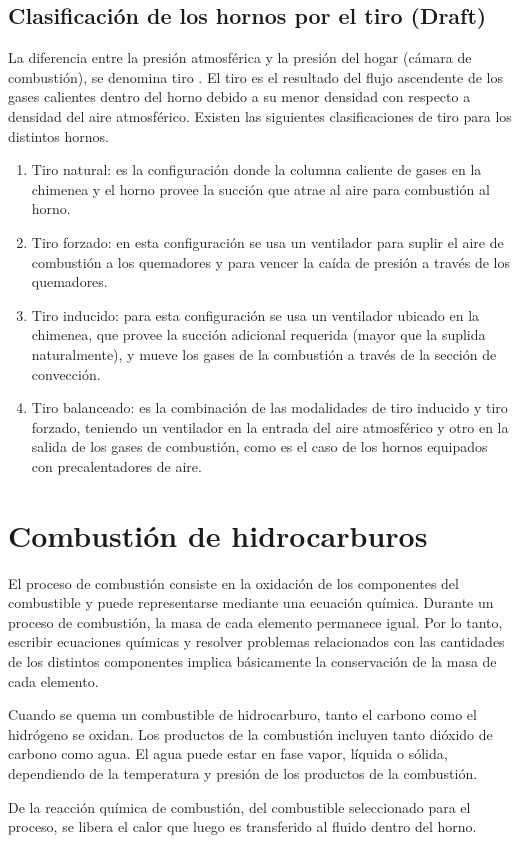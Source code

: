 \subsection{Clasificación de los hornos por el tiro (Draft)}
\par La diferencia entre la presión atmosférica y la presión del hogar (cámara de combustión), se denomina tiro \cite{bib:draft}. El tiro es el resultado del flujo ascendente de los gases calientes dentro del horno debido a su menor densidad con respecto a densidad del aire atmosférico. Existen las siguientes clasificaciones de tiro para los distintos hornos.
\begin{enumerate}
    \item Tiro natural: es la configuración donde la columna caliente de gases en la chimenea y el horno provee la succión que atrae al aire para combustión al horno.
    \item Tiro forzado: en esta configuración se usa un ventilador para suplir el aire de combustión a los quemadores y para vencer la caída de presión a través de los quemadores.
    \item Tiro inducido: para esta configuración se usa un ventilador ubicado en la chimenea, que provee la succión adicional requerida (mayor que la suplida naturalmente), y mueve los gases de la combustión a través de la sección de convección.
    \item Tiro balanceado: es la combinación de las modalidades de tiro inducido y tiro forzado, teniendo un ventilador en la entrada del aire atmosférico y otro en la salida de los gases de combustión, como es el caso de los hornos equipados con precalentadores de aire.
\end{enumerate}

\section{Combustión de hidrocarburos}

\par El proceso de combustión consiste en la oxidación de los componentes del combustible y puede representarse mediante una ecuación química. Durante un proceso de combustión, la masa de cada elemento permanece igual. Por lo tanto, escribir ecuaciones químicas y resolver problemas relacionados con las cantidades de los distintos componentes implica básicamente la conservación de la masa de cada elemento. 
\par Cuando se quema un combustible de hidrocarburo, tanto el carbono como el hidrógeno se oxidan. Los productos de la combustión incluyen tanto dióxido de carbono como agua. El agua puede estar en fase vapor, líquida o sólida, dependiendo de la temperatura y presión de los productos de la combustión.
\par De la reacción química de combustión, del combustible seleccionado para el proceso, se libera el calor que luego es transferido al fluido dentro del horno.

